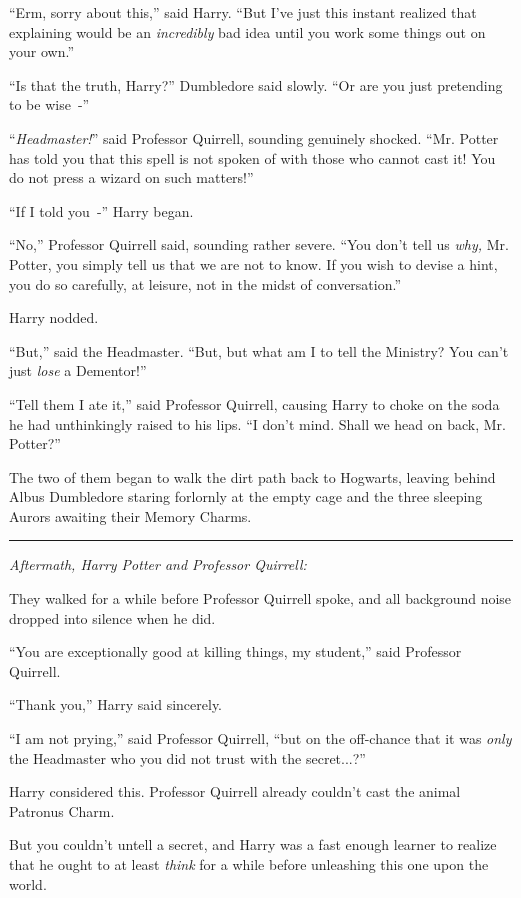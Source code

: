 ``Erm, sorry about this,'' said Harry. ``But I've just this instant realized that explaining would be an \emph{incredibly} bad idea until you work some things out on your own.''

``Is that the truth, Harry?'' Dumbledore said slowly. ``Or are you just pretending to be wise~-''

``\emph{Headmaster!}'' said Professor Quirrell, sounding genuinely shocked. ``Mr. Potter has told you that this spell is not spoken of with those who cannot cast it! You do not press a wizard on such matters!''

``If I told you~-'' Harry began.

``No,'' Professor Quirrell said, sounding rather severe. ``You don't tell us \emph{why,} Mr. Potter, you simply tell us that we are not to know. If you wish to devise a hint, you do so carefully, at leisure, not in the midst of conversation.''

Harry nodded.

``But,'' said the Headmaster. ``But, but what am I to tell the Ministry? You can't just \emph{lose} a Dementor!''

``Tell them I ate it,'' said Professor Quirrell, causing Harry to choke on the soda he had unthinkingly raised to his lips. ``I don't mind. Shall we head on back, Mr. Potter?''

The two of them began to walk the dirt path back to Hogwarts, leaving behind Albus Dumbledore staring forlornly at the empty cage and the three sleeping Aurors awaiting their Memory Charms.

\begin{center}\rule{3in}{0.4pt}\end{center}

\emph{Aftermath, Harry Potter and Professor Quirrell:}

They walked for a while before Professor Quirrell spoke, and all background noise dropped into silence when he did.

``You are exceptionally good at killing things, my student,'' said Professor Quirrell.

``Thank you,'' Harry said sincerely.

``I am not prying,'' said Professor Quirrell, ``but on the off-chance that it was \emph{only} the Headmaster who you did not trust with the secret...?''

Harry considered this. Professor Quirrell already couldn't cast the animal Patronus Charm.

But you couldn't untell a secret, and Harry was a fast enough learner to realize that he ought to at least \emph{think} for a while before unleashing this one upon the world.

